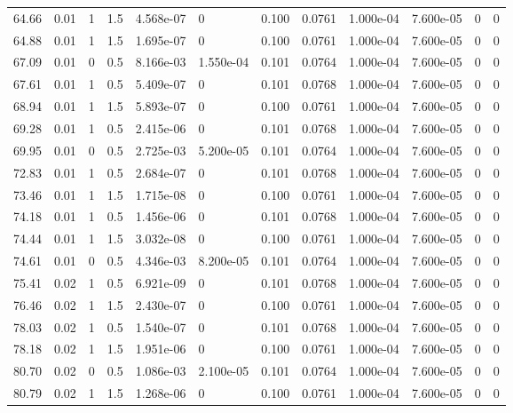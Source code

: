 \documentclass[preview]{standalone}
\begin{document}
{{{\begin{tabular}{L{1.2cm}C{1.2cm} C{0.3cm}C{0.5cm} C{1.4cm}C{1.4cm} C{1.4cm}C{1.4cm} C{1.6cm}C{1.6cm} C{1.6cm}C{1.6cm}}
  64.66  &  0.01  & 1     & 1.5 &  4.568e-07  & 0  &  0.100&   0.0761& 1.000e-04 & 7.600e-05   &  0 & 0  \\ 
  64.88  &  0.01  & 1     & 1.5 &  1.695e-07  & 0  &  0.100&   0.0761& 1.000e-04 & 7.600e-05   &  0 & 0  \\ 
  67.09  &  0.01  & 0     & 0.5 &  8.166e-03  & 1.550e-04  &  0.101&   0.0764& 1.000e-04 & 7.600e-05   &  0 & 0  \\ 
  67.61  &  0.01  & 1     & 0.5 &  5.409e-07  & 0  &  0.101&   0.0768& 1.000e-04 & 7.600e-05   &  0 & 0  \\ 
  68.94  &  0.01  & 1     & 1.5 &  5.893e-07  & 0  &  0.100&   0.0761& 1.000e-04 & 7.600e-05   &  0 & 0  \\ 
  69.28  &  0.01  & 1     & 0.5 &  2.415e-06  & 0  &  0.101&   0.0768& 1.000e-04 & 7.600e-05   &  0 & 0  \\ 
  69.95  &  0.01  & 0     & 0.5 &  2.725e-03  & 5.200e-05  &  0.101&   0.0764& 1.000e-04 & 7.600e-05   &  0 & 0  \\ 
  72.83  &  0.01  & 1     & 0.5 &  2.684e-07  & 0  &  0.101&   0.0768& 1.000e-04 & 7.600e-05   &  0 & 0  \\ 
  73.46  &  0.01  & 1     & 1.5 &  1.715e-08  & 0  &  0.100&   0.0761& 1.000e-04 & 7.600e-05   &  0 & 0  \\ 
  74.18  &  0.01  & 1     & 0.5 &  1.456e-06  & 0  &  0.101&   0.0768& 1.000e-04 & 7.600e-05   &  0 & 0  \\ 
  74.44  &  0.01  & 1     & 1.5 &  3.032e-08  & 0  &  0.100&   0.0761& 1.000e-04 & 7.600e-05   &  0 & 0  \\ 
  74.61  &  0.01  & 0     & 0.5 &  4.346e-03  & 8.200e-05  &  0.101&   0.0764& 1.000e-04 & 7.600e-05   &  0 & 0  \\ 
  75.41  &  0.02  & 1     & 0.5 &  6.921e-09  & 0  &  0.101&   0.0768& 1.000e-04 & 7.600e-05   &  0 & 0  \\ 
  76.46  &  0.02  & 1     & 1.5 &  2.430e-07  & 0  &  0.100&   0.0761& 1.000e-04 & 7.600e-05   &  0 & 0  \\ 
  78.03  &  0.02  & 1     & 0.5 &  1.540e-07  & 0  &  0.101&   0.0768& 1.000e-04 & 7.600e-05   &  0 & 0  \\ 
  78.18  &  0.02  & 1     & 1.5 &  1.951e-06  & 0  &  0.100&   0.0761& 1.000e-04 & 7.600e-05   &  0 & 0  \\ 
  80.70  &  0.02  & 0     & 0.5 &  1.086e-03  & 2.100e-05  &  0.101&   0.0764& 1.000e-04 & 7.600e-05   &  0 & 0  \\ 
  80.79  &  0.02  & 1     & 1.5 &  1.268e-06  & 0  &  0.100&   0.0761& 1.000e-04 & 7.600e-05   &  0 & 0  \\ 

\end{tabular}}}}
\end{document}

